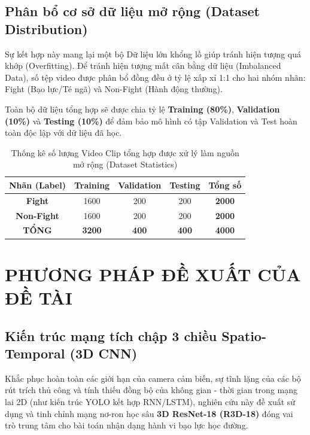 \documentclass[conference]{IEEEtran}
\begin{document}
\subsection{Phân bổ cơ sở dữ liệu mở rộng (Dataset Distribution)}
Sự kết hợp này mang lại một bộ Dữ liệu lớn khổng lồ giúp tránh hiện tượng quá khớp (Overfitting). Để tránh hiện tượng mất cân bằng dữ liệu (Imbalanced Data), số tệp video được phân bổ đồng đều ở tỷ lệ xấp xỉ 1:1 cho hai nhóm nhãn: Fight (Bạo lực/Té ngã) và Non-Fight (Hành động thường). 

Toàn bộ dữ liệu tổng hợp sẽ được chia tỷ lệ \textbf{Training (80\%)}, \textbf{Validation (10\%)} và \textbf{Testing (10\%)} để đảm bảo mô hình có tập Validation và Test hoàn toàn độc lập với dữ liệu đã học.

\begin{table}[htbp]
\caption{Thống kê số lượng Video Clip tổng hợp được xử lý làm nguồn mở rộng (Dataset Statistics)}
\begin{center}
\begin{tabular}{|c|c|c|c|c|}
\hline
\textbf{Nhãn (Label)} & \textbf{Training} & \textbf{Validation} & \textbf{Testing} & \textbf{Tổng số} \\
\hline
\textbf{Fight} & 1600 & 200 & 200 & \textbf{2000} \\ %
\hline
\textbf{Non-Fight} & 1600 & 200 & 200 & \textbf{2000} \\ %
\hline
\textbf{TỔNG} & \textbf{3200} & \textbf{400} & \textbf{400} & \textbf{4000} \\ %
\hline
\end{tabular}
\label{tab:extended_dataset_stats}
\end{center}
\end{table}


\section{PHƯƠNG PHÁP ĐỀ XUẤT CỦA ĐỀ TÀI}

\subsection{Kiến trúc mạng tích chập 3 chiều Spatio-Temporal (3D CNN)}
Khắc phục hoàn toàn các giới hạn của camera cảm biến, sự tĩnh lặng của các bộ rút trích thủ công và tính thiếu đồng bộ của không gian - thời gian trong mạng lai 2D (như kiến trúc YOLO kết hợp RNN/LSTM), nghiên cứu này đề xuất sử dụng và tinh chỉnh mạng nơ-ron học sâu \textbf{3D ResNet-18 (R3D-18)} đóng vai trò trung tâm cho bài toán nhận dạng hành vi bạo lực học đường.
\end{document}
